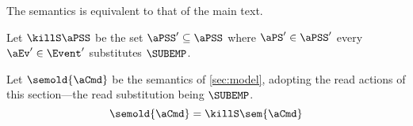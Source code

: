 The semantics is equivalent to that of the main text.

Let $\killS\aPSS$ be the set $\aPSS'\subseteq\aPSS$ where $\aPS'\in\aPSS'$
every $\aEv'\in\Event'$ substitutes $\SUBEMP$.

\begin{proposition}
  \label{thm:seq}
  Let $\semold{\aCmd}$ be the semantics of \textsection\ref{sec:model},
  adopting the read actions of this section---the read substitution
  being $\SUBEMP$.
\begin{displaymath}
  \semold{\aCmd} = \killS\sem{\aCmd}
\end{displaymath}
\end{proposition}








